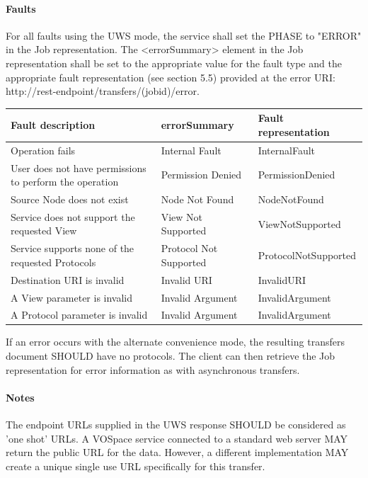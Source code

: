 \documentclass[11pt,a4paper]{ivoa}
\begin{document}
\paragraph{Faults}
For all faults using the UWS mode, the service shall set the PHASE to "ERROR" in the Job representation. The <errorSummary> element in the Job representation shall be set to the appropriate value for the fault type and the appropriate fault representation (see section 5.5) provided at the error URI: http://rest-endpoint/transfers/(jobid)/error.

\vspace{3mm}
\begin{tabular}{ p{5cm} l p{4cm} }
\textbf{Fault description} & \textbf{errorSummary} & \textbf{Fault representation} \\
\hline
Operation fails & Internal Fault & InternalFault \\
\hline
User does not have permissions to perform the operation	 & Permission Denied & PermissionDenied \\
\hline
Source Node does not exist & Node Not Found & NodeNotFound \\
\hline
Service does not support the requested View & View Not Supported & ViewNotSupported \\
\hline
Service supports none of the requested Protocols & Protocol Not Supported &ProtocolNotSupported \\
\hline
Destination URI is invalid & Invalid URI & InvalidURI \\
\hline
A View parameter is invalid & Invalid Argument & InvalidArgument \\
\hline
A Protocol parameter is invalid & Invalid Argument & InvalidArgument \\
\hline
\end{tabular}
\vspace{3mm}

If an error occurs with the alternate convenience mode, the resulting transfers document SHOULD have no protocols. The client can then retrieve the Job representation for error information as with asynchronous transfers.

\paragraph{Notes}
The endpoint URLs supplied in the UWS response SHOULD be considered as 'one shot' URLs. A VOSpace service connected to a standard web server MAY return the public URL for the data. However, a different implementation MAY create a unique single use URL specifically for this transfer.
\end{document}
